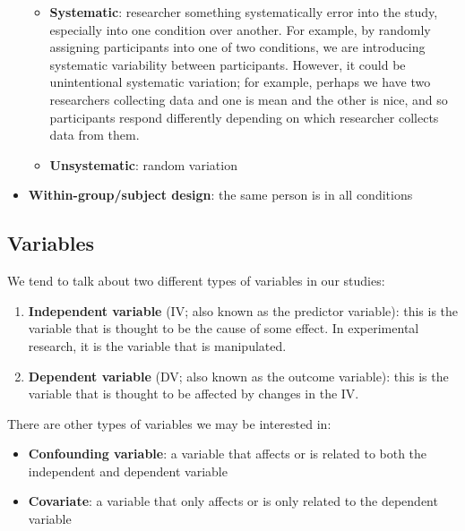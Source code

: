 \documentclass[
]{book}
\providecommand{\tightlist}{%
  \setlength{\itemsep}{0pt}\setlength{\parskip}{0pt}}
\begin{document}
\begin{itemize}
  \begin{itemize}
  \tightlist
  \item
    \textbf{Systematic}: researcher something systematically error into the study, especially into one condition over another. For example, by randomly assigning participants into one of two conditions, we are introducing systematic variability between participants. However, it could be unintentional systematic variation; for example, perhaps we have two researchers collecting data and one is mean and the other is nice, and so participants respond differently depending on which researcher collects data from them.
  \item
    \textbf{Unsystematic}: random variation
  \end{itemize}
\item
  \textbf{Within-group/subject design}: the same person is in all conditions
\end{itemize}

\hypertarget{variables}{%
\subsection{Variables}\label{variables}}

We tend to talk about two different types of variables in our studies:

\begin{enumerate}
\def\labelenumi{\arabic{enumi}.}
\tightlist
\item
  \textbf{Independent variable} (IV; also known as the predictor variable): this is the variable that is thought to be the cause of some effect. In experimental research, it is the variable that is manipulated.
\item
  \textbf{Dependent variable} (DV; also known as the outcome variable): this is the variable that is thought to be affected by changes in the IV.
\end{enumerate}

There are other types of variables we may be interested in:

\begin{itemize}
\tightlist
\item
  \textbf{Confounding variable}: a variable that affects or is related to both the independent and dependent variable
\item
  \textbf{Covariate}: a variable that only affects or is only related to the dependent variable
\end{itemize}
\end{document}

